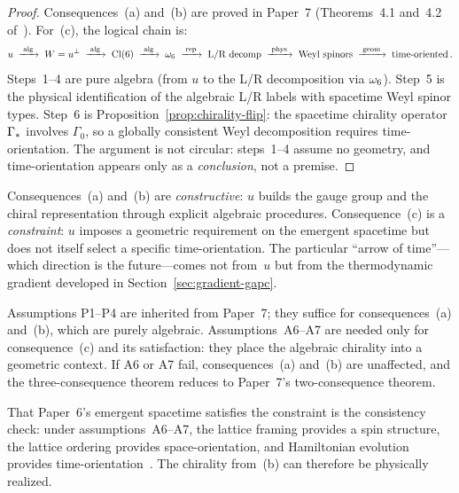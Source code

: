 \begin{proof}
Consequences~(a) and~(b) are proved in Paper~7
(Theorems~4.1 and~4.2 of~\cite{Paper7}).  For~(c), the logical
chain is:
\begin{equation}\label{eq:logical-chain}
  u \;\xrightarrow{\;\text{alg}\;}\; W = u^\perp
  \;\xrightarrow{\;\text{alg}\;}\; \mathrm{Cl}(6)
  \;\xrightarrow{\;\text{alg}\;}\; \omega_6
  \;\xrightarrow{\;\text{rep}\;}\;
  \text{L/R decomp}
  \;\xrightarrow{\;\text{phys}\;}\;
  \text{Weyl spinors}
  \;\xrightarrow{\;\text{geom}\;}\;
  \text{time-oriented}\,.
\end{equation}
Steps~1--4 are pure algebra (from $u$ to the L/R decomposition via
$\omega_6$).  Step~5 is the physical identification of the
algebraic L/R labels with spacetime Weyl spinor types.  Step~6 is
Proposition~\ref{prop:chirality-flip}: the spacetime chirality
operator $\Gamma_*$ involves $\Gamma_0$, so a globally consistent
Weyl decomposition requires time-orientation.
The argument is not circular: steps~1--4 assume no geometry, and
time-orientation appears only as a \emph{conclusion}, not a
premise.
\end{proof}

\begin{remark}\label{rem:constraint-not-constructive}
Consequences~(a) and~(b) are \emph{constructive}: $u$ builds the
gauge group and the chiral representation through explicit algebraic
procedures.  Consequence~(c) is a \emph{constraint}: $u$ imposes a
geometric requirement on the emergent spacetime but does not itself
select a specific time-orientation.  The particular ``arrow of
time''---which direction is the future---comes not from~$u$ but
from the thermodynamic gradient developed in
Section~\ref{sec:gradient-gapc}.
\end{remark}

\begin{remark}\label{rem:new-assumptions}
Assumptions P1--P4 are inherited from Paper~7; they suffice for
consequences~(a) and~(b), which are purely algebraic.
Assumptions~A6--A7 are needed only for consequence~(c) and its
satisfaction: they place the algebraic chirality into a geometric
context.  If A6 or A7 fail, consequences~(a) and~(b) are
unaffected, and the three-consequence theorem reduces to Paper~7's
two-consequence theorem.
\end{remark}

\medskip
That Paper~6's emergent spacetime satisfies the constraint is the
consistency check: under assumptions~A6--A7, the lattice framing
provides a spin structure, the lattice ordering provides
space-orientation, and Hamiltonian evolution provides
time-orientation~\cite{Paper6}.  The chirality from~(b) can
therefore be physically realized.

